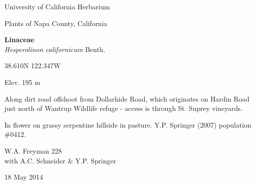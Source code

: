 \documentclass[letterpaper,10pt]{article}
\begin{document}
\begin{minipage}[t]{0.40\textwidth}

\begin{center}
University of California Herbarium \\
\begin{large}
Plants of Napa County, California \\
\end{large}
\vspace{\baselineskip}
\textbf{Linaceae} \\
\textit{Hesperolinon californicum} Benth.\\
\end{center}

\begin{footnotesize}

\begin{multicols}{2}
38.610\textdegree N 122.347\textdegree W
\columnbreak
\begin{flushright}
Elev. 195 m
\end{flushright}
\end{multicols}

Along dirt road offshoot from Dollarhide Road, which originates on Hardin Road just north of Wantrup Wildlife refuge - access is through St. Suprey vineyards.
\vspace{\baselineskip}

In flower on grassy serpentine hillside in pasture. Y.P. Springer (2007) population \#0412.

\begin{multicols}{2}
W.A. Freyman 228 \\
with A.C. Schneider \& Y.P. Springer
\columnbreak
\begin{flushright}
18 May 2014
\end{flushright}
\end{multicols}

\end{footnotesize}

\end{minipage}
%
\hspace{2cm}
%
\end{document}
